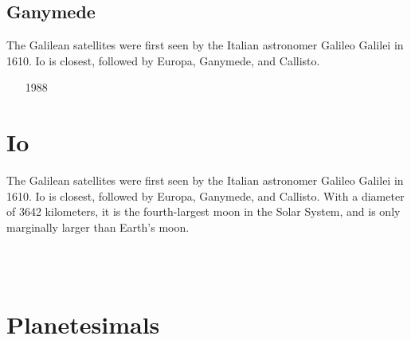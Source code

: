 \subsection{Ganymede}

The Galilean satellites were first seen by the Italian astronomer Galileo Galilei in 1610. 
Io is closest, followed by Europa, Ganymede, and Callisto.

\begin{scriptsize}
\begin{itemize}
\item[1988]
\item[\twothousandsix]
\item[\twothousandfourteen]
\end{itemize}
\end{scriptsize}


\section{Io}

The Galilean satellites were first seen by the Italian astronomer Galileo Galilei in 1610. 
Io is closest, followed by Europa, Ganymede, and Callisto.
With a diameter of 3642 kilometers, it is the fourth-largest moon in the Solar System, 
and is only marginally larger than Earth's moon.

\begin{scriptsize}
\begin{itemize}
\item[\twothousandone]
 \\ 
 \\
\end{itemize}
\end{scriptsize}

\section{Planetesimals}

\begin{scriptsize}
\begin{itemize}
\item[\twothousandfourteen]
\item[\twothousandnineteen]
 \\
\end{itemize}
\end{scriptsize}


